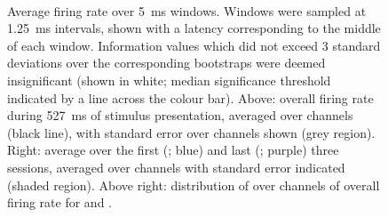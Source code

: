 \begin{figure}[htbp]%
    \centering
    \hspace*{\fill}
    \hspace*{\fill}\hspace{.2cm}\hspace*{\fill}
    \hspace*{\fill}
    \\
    \hspace*{\fill}
    \hspace*{\fill}\hspace{.2cm}\hspace*{\fill}
    \hspace*{\fill}
    \caption{Average firing rate over \SI{5}{\milli\second} windows.
Windows were sampled at \SI{1.25}{\milli\second} intervals, shown with a latency corresponding to the middle of each window.
Information values which did not exceed \num{3} standard deviations over the corresponding bootstraps were deemed insignificant (shown in white; median significance threshold indicated by a line across the colour bar).
Above: overall firing rate during \SI{527}{\milli\second} of stimulus presentation, averaged over channels (black line), with standard error over channels shown (grey region).
Right: average over the first (; blue) and last (; purple) three sessions, averaged over channels with standard error indicated (shaded region).
Above right: distribution of over channels of overall firing rate for  and .
    \label{fig:fr_hm}
}
\end{figure}


